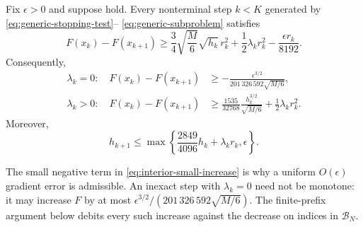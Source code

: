 \documentclass{article}
\begin{document}
\begin{lemma}
\label{lem:one-step}
Fix $\epsilon>0$ and suppose
 hold.  Every nonterminal step
$k<K$ generated by \eqref{eq:generic-stopping-test}--
\eqref{eq:generic-subproblem} satisfies
\begin{equation}\label{eq:basic-decrease}
 F(x_k)-F(x_{k+1})
 \ge \frac34\sqrt{\frac M6}\sqrt{h_k}\,r_k^2
     +\frac12\lambda_kr_k^2-\frac{\epsilon r_k}{8192}.
\end{equation}
Consequently,
\begin{subequations}\label{eq:step-type-decrease}
\begin{align}
 \lambda_k=0:\quad
 F(x_k)-F(x_{k+1})
 &\ge-\frac{\epsilon^{3/2}}{201\,326\,592\sqrt{M/6}},
      \label{eq:interior-small-increase}\\
 \lambda_k>0:\quad
 F(x_k)-F(x_{k+1})
 &\ge\frac{1535}{32768}
       \frac{h_k^{3/2}}{\sqrt{M/6}}
       +\frac12\lambda_kr_k^2.
      \label{eq:boundary-decrease}
\end{align}
\end{subequations}
Moreover,
\begin{equation}\label{eq:gradient-recurrence}
 h_{k+1}\le
 \max\left\{\frac{2849}{4096}h_k
                   +\lambda_kr_k,\epsilon\right\}.
\end{equation}
\end{lemma}

The small negative term in \eqref{eq:interior-small-increase} is why a
uniform $O(\epsilon)$ gradient error is admissible.  An inexact step
with $\lambda_k=0$ need not be monotone: it may increase $F$ by at
most $\epsilon^{3/2}/(201\,326\,592\sqrt{M/6})$.  The finite-prefix argument
below debits every such increase against the decrease on indices in
$\mathcal B_N$.
\end{document}

